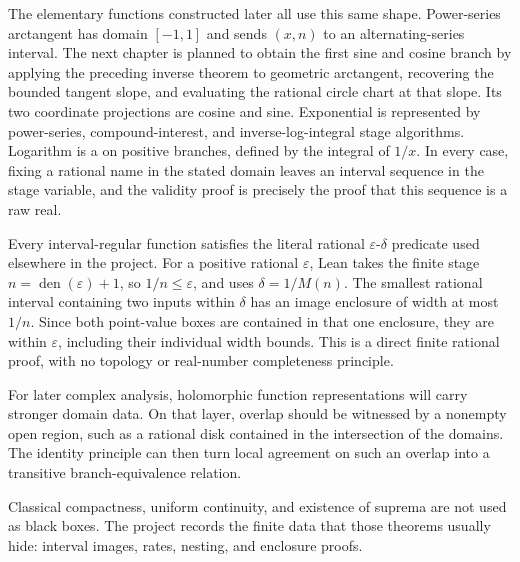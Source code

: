 \begin{remark}
\label{rem:elementary-functions-are-function-representations}
The elementary functions constructed later all use this same shape.
Power-series arctangent has domain \([-1,1]\) and sends \((x,n)\) to an
alternating-series interval.  The next chapter is planned to obtain the first
sine and cosine branch by applying the preceding inverse theorem to geometric
arctangent, recovering the bounded tangent slope, and evaluating the rational
circle chart at that slope.  Its two coordinate projections are cosine and
sine.  Exponential is
represented by power-series, compound-interest, and inverse-log-integral
stage algorithms.  Logarithm is a  on positive
branches, defined by the integral of \(1/x\).  In every case, fixing a
rational name in the stated domain leaves an interval sequence in the stage
variable, and the validity proof is precisely the proof that this sequence is
a raw real.
\end{remark}

\begin{theorem}
\label{thm:interval-regular-implies-epsilon-delta}
\leanok
Every interval-regular function satisfies the literal rational
\(\varepsilon\)-\(\delta\) predicate used elsewhere in the project.  For a
positive rational \(\varepsilon\), Lean takes the finite stage
\(n=\operatorname{den}(\varepsilon)+1\), so \(1/n\le\varepsilon\), and
uses \(\delta=1/M(n)\).  The smallest rational interval containing two
inputs within \(\delta\) has an image enclosure of width at most
\(1/n\).  Since both point-value boxes are contained in that one enclosure,
they are  within \(\varepsilon\), including their individual
width bounds.  This is a direct finite rational proof, with no topology or
real-number completeness principle.
\end{theorem}

\begin{remark}\label{rem:holomorphic-branch-equivalence}
For later complex analysis, holomorphic function representations will carry
stronger domain data.  On that layer, overlap should be witnessed by a
nonempty open region, such as a rational disk contained in the intersection of
the domains.  The identity principle can then turn local agreement on such an
overlap into a transitive branch-equivalence relation.
\end{remark}

\begin{remark}\label{rem:completeness-replaced-by-moduli}
Classical compactness, uniform continuity, and existence of suprema are not
used as black boxes.  The project records the finite data that those theorems
usually hide: interval images, rates, nesting, and enclosure proofs.
\end{remark}
